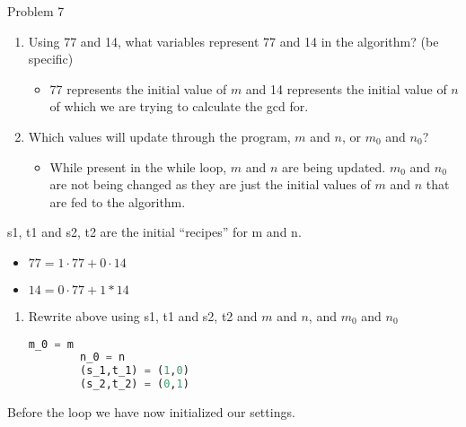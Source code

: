 \begin{problem}{Problem 7}
    \begin{Highlight}[Solution]
        \begin{enumerate}
            \item Using 77 and 14, what variables represent 77 and 14 in the algorithm? (be specific)
            \begin{itemize}
                \item 77 represents the initial value of $m$ and 14 represents the initial value of $n$ of which we are trying to calculate the gcd for.
            \end{itemize}
            \item Which values will update through the program, $m$ and $n$, or $m_{0}$ and $n_{0}$?
            \begin{itemize}
                \item While present in the while loop, $m$ and $n$ are being updated. $m_{0}$ and $n_{0}$ are not being changed as they are just the initial values of $m$ and $n$ that are fed to the 
                algorithm.
            \end{itemize}
        \end{enumerate}
        s1, t1 and s2, t2 are the initial “recipes” for m and n.

        \begin{itemize}
            \item $77 = 1 \cdot 77 + 0 \cdot 14$
            \item $14 = 0 \cdot 77 + 1 * 14$
        \end{itemize}

        \begin{enumerate}[start = 3]
            \item Rewrite above using s1, t1 and s2, t2 and $m$ and $n$, and $m_{0}$ and $n_{0}$
    \begin{lstlisting}[style=stackoverflow, language=python]
        m_0 = m
        n_0 = n
        (s_1,t_1) = (1,0)
        (s_2,t_2) = (0,1)
    \end{lstlisting}
        \end{enumerate}
        Before the loop we have now initialized our settings.


\end{Highlight}
\end{problem}
